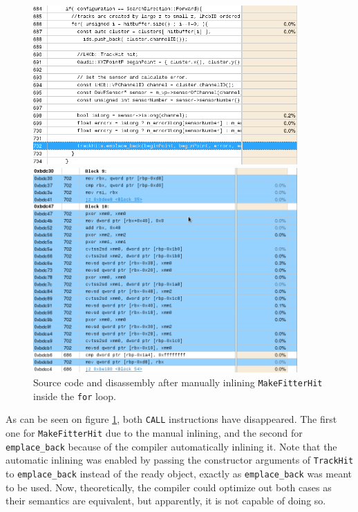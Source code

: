 \documentclass[12pt]{article}
\newcommand{\code}[1]{\texttt{#1}}
\begin{document}
\begin{figure}[H]
	\begin{center}
		\includegraphics[width=0.9\textwidth]{kalmanfit_disasm_opt_src_inlined}
	\end{center}
	\begin{center}
		\includegraphics[width=0.9\textwidth]{kalmanfit_disasm_opt_asm_inlined}
	\end{center}
	\caption[Code growth performance mitigated]{Source code and disassembly after manually inlining \code{MakeFitterHit} inside the \code{for} loop.}
	\label{fig_kalman_disasm_src_inlined}
\end{figure}

As can be seen on figure \ref{fig_kalman_disasm_src_inlined}, both \code{CALL} instructions have disappeared. The first one for \code{MakeFitterHit} due to the manual inlining, and the second for \code{emplace\_back} because of the compiler automatically inlining it. Note that the automatic inlining was enabled by passing the constructor arguments of \code{TrackHit} to \code{emplace\_back} instead of the ready object, exactly as \code{emplace\_back} was meant to be used. Now, theoretically, the compiler could optimize out both cases as their semantics are equivalent, but apparently, it is not capable of doing so.
\end{document}
